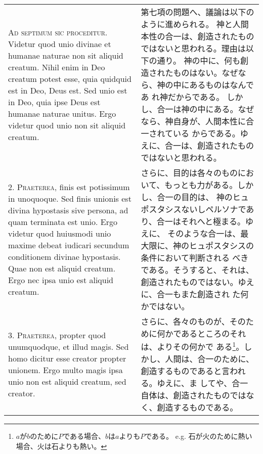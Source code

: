 \documentclass[10pt]{jsarticle} %
\begin{document}
\begin{longtable}{p{21em}p{21em}}

{\Huge A}{\scshape d septimum sic proceditur}. Videtur quod unio divinae et humanae naturae
non sit aliquid creatum. Nihil enim in Deo creatum potest esse, quia
quidquid est in Deo, Deus est. Sed unio est in Deo, quia ipse Deus est
humanae naturae unitus. Ergo videtur quod unio non sit aliquid creatum.


&

第七項の問題へ、議論は以下のように進められる。
神と人間本性の合一は、創造されたものではないと思われる。理由は以下の通り。
神の中に、何も創造されたものはない。なぜなら、神の中にあるものはなんであ
 れ神だからである。
しかし、合一は神の中にある。なぜなら、神自身が、人間本性に合一されている
 からである。ゆえに、合一は、創造されたものではないと思われる。


\\



2. {\scshape Praeterea}, finis est potissimum in unoquoque. Sed finis unionis est
divina hypostasis sive persona, ad quam terminata est unio. Ergo videtur
quod huiusmodi unio maxime debeat iudicari secundum conditionem divinae
hypostasis. Quae non est aliquid creatum. Ergo nec ipsa unio est aliquid
creatum.


&

さらに、目的は各々のものにおいて、もっとも力がある。しかし、合一の目的は、
 神のヒュポスタシスないしペルソナであり、合一はそれへと極まる。ゆえに、
 そのような合一は、最大限に、神のヒュポスタシスの条件において判断される
 べきである。そうすると、それは、創造されたものではない。ゆえに、合一もまた創造され
 た何かではない。

\\



3. {\scshape Praeterea}, propter quod unumquodque, et illud magis. Sed homo dicitur
esse creator propter unionem. Ergo multo magis ipsa unio non est aliquid
creatum, sed creator.


&

さらに、各々のものが、そのために何かであるところのそれは、よりその何かで
 ある\footnote{$a$が$b$のために$P$である場合、$b$は$a$よりも$P$である。
 e.g. 石が火のために熱い場合、火は石よりも熱い。}。しかし、人間は、合一のために、創造するものであると言われる。ゆえに、ま
 してや、合一自体は、創造されたものではなく、創造するものである。

\\




\end{longtable}
\end{document}
